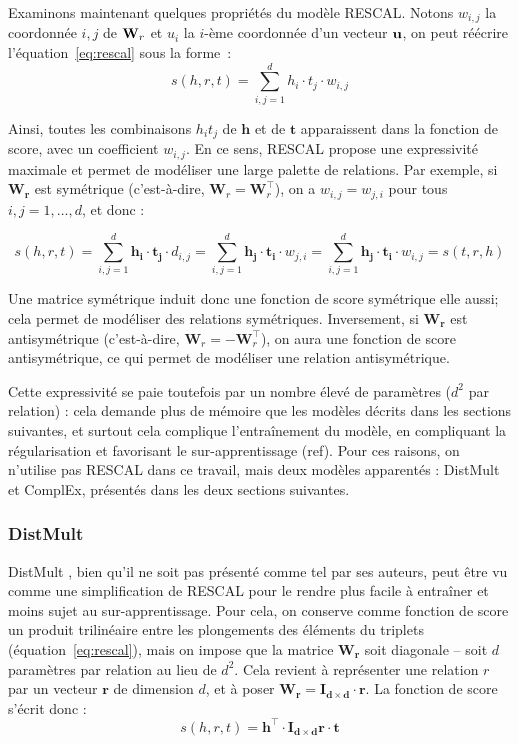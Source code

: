 Examinons maintenant quelques propriétés du modèle RESCAL. Notons $w_{i, j}$ la coordonnée $i,j$ de $\bf{W}_r$ et $u_i$ la $i$-ème coordonnée d'un vecteur $\bf{u}$, on peut réécrire l'équation~\ref{eq:rescal} sous la forme~:
\begin{equation}
    s(h, r, t) = \sum_{i, j = 1}^{d} h_i \cdot t_j \cdot w_{i, j}
\end{equation}

Ainsi, toutes les combinaisons $h_i t_j$ de $\mathbf{h}$ et de $\mathbf{t}$ apparaissent dans la fonction de score, avec un coefficient $w_{i, j}$. En ce sens, RESCAL propose une expressivité maximale et permet de modéliser une large palette de relations. Par exemple, si $\mathbf{W_r}$ est symétrique (c'est-à-dire, $\mathbf{W}_r = \mathbf{W}_r^\top$), on a $w_{i,j} = w_{j, i}$ pour tous $i, j = 1, \ldots, d$, et donc :

\begin{equation}
    s(h, r, t) = \sum_{i, j = 1}^{d} \mathbf{h_i \cdot t_j} \cdot d_{i, j}
    =  \sum_{i, j = 1}^{d} \mathbf{h_j \cdot t_i} \cdot w_{j, i}
    =  \sum_{i, j = 1}^{d} \mathbf{h_j \cdot t_i} \cdot w_{i, j}
    = s(t, r, h)
\end{equation}

Une matrice symétrique induit donc une fonction de score symétrique elle aussi; cela permet de modéliser des relations symétriques. Inversement, si $\mathbf{W_r}$ est antisymétrique (c'est-à-dire, $\mathbf{W}_r = -\mathbf{W}_r^\top$), on aura une fonction de score antisymétrique, ce qui permet de modéliser une relation antisymétrique.

Cette expressivité se paie toutefois par un nombre élevé de paramètres ($d^2$ par relation) : cela demande plus de mémoire que les modèles décrits dans les sections suivantes, et surtout cela complique l'entraînement du modèle, en compliquant la régularisation et favorisant le sur-apprentissage (ref). Pour ces raisons, on n'utilise pas RESCAL dans ce travail, mais deux modèles apparentés : DistMult et ComplEx, présentés dans les deux sections suivantes.

\subsubsection{DistMult}

DistMult \cite{distmult}, bien qu'il ne soit pas présenté comme tel par ses auteurs, peut être vu comme une simplification de RESCAL pour le rendre plus facile à entraîner et moins sujet au sur-apprentissage. Pour cela, on conserve comme fonction de score un produit trilinéaire entre les plongements des éléments du triplets  (équation~\ref{eq:rescal}), mais on impose que la matrice $\mathbf{W_r}$ soit diagonale – soit $d$ paramètres par relation au lieu de $d^2$. Cela revient à représenter une relation $r$ par un vecteur $\mathbf{r}$ de dimension $d$, et à poser $\mathbf{W_r = I_{d\times d} \cdot r}$. La fonction de score s'écrit donc :
\begin{equation}
    \label{eq:distmult}
    s(h, r, t) = \mathbf{h^\top \cdot I_{d\times d}r \cdot t}
\end{equation}

